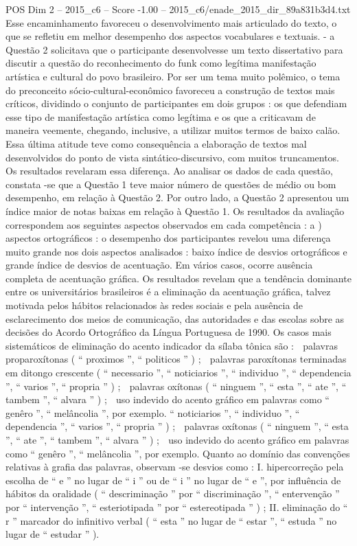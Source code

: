 \begin{textsample}{POS Dim 2 – 2015\_c6 – Score -1.00 – 2015\_c6/enade\_2015\_dir\_89a831b3d4.txt}
Esse encaminhamento favoreceu o desenvolvimento mais articulado do texto, o que se refletiu em melhor desempenho dos aspectos vocabulares e textuais. - a Questão 2 solicitava que o participante desenvolvesse um texto dissertativo para discutir a questão do reconhecimento do funk como legítima manifestação artística e cultural do povo brasileiro.
Por ser um tema muito polêmico, o tema do preconceito sócio-cultural-econômico favoreceu a construção de textos mais críticos, dividindo o conjunto de participantes em dois grupos : os que defendiam esse tipo de manifestação artística como legítima e os que a criticavam de maneira veemente, chegando, inclusive, a utilizar muitos termos de baixo calão.
Essa última atitude teve como consequência a elaboração de textos mal desenvolvidos do ponto de vista sintático-discursivo, com muitos truncamentos.
Os resultados revelaram essa diferença.
Ao analisar os dados de cada questão, constata -se que a Questão 1 teve maior número de questões de médio ou bom desempenho, em relação à Questão 2.
Por outro lado, a Questão 2 apresentou um índice maior de notas baixas em relação à Questão 1.
Os resultados da avaliação correspondem aos seguintes aspectos observados em cada competência : a ) aspectos ortográficos : o desempenho dos participantes revelou uma diferença muito grande nos dois aspectos analisados : baixo índice de desvios ortográficos e grande índice de desvios de acentuação.
Em vários casos, ocorre ausência completa de acentuação gráfica.
Os resultados revelam que a tendência dominante entre os universitários brasileiros é a eliminação da acentuação gráfica, talvez motivada pelos hábitos relacionados às redes sociais e pela ausência de esclarecimento dos meios de comunicação, das autoridades e das escolas sobre as decisões do Acordo Ortográfico da Língua Portuguesa de 1990.
Os casos mais sistemáticos de eliminação do acento indicador da sílaba tônica são :  palavras proparoxítonas ( “ proximos ”, “ politicos ” ) ;  palavras paroxítonas terminadas em ditongo crescente ( “ necessario ”, “ noticiarios ”, “ individuo ”, “ dependencia ”, “ varios ”, “ propria ” ) ;  palavras oxítonas ( “ ninguem ”, “ esta ”, “ ate ”, “ tambem ”, “ alvara ” ) ;  uso indevido do acento gráfico em palavras como “ genêro ”, “ melâncolia ”, por exemplo. “ noticiarios ”, “ individuo ”, “ dependencia ”, “ varios ”, “ propria ” ) ;  palavras oxítonas ( “ ninguem ”, “ esta ”, “ ate ”, “ tambem ”, “ alvara ” ) ;  uso indevido do acento gráfico em palavras como “ genêro ”, “ melâncolia ”, por exemplo.
Quanto ao domínio das convenções relativas à grafia das palavras, observam -se desvios como : I. hipercorreção pela escolha de “ e ” no lugar de “ i ” ou de “ i ” no lugar de “ e ”, por influência de hábitos da oralidade ( “ descriminação ” por “ discriminação ”, “ entervenção ” por “ intervenção ”, “ esteriotipada ” por “ estereotipada ” ) ; II. eliminação do “ r ” marcador do infinitivo verbal ( “ esta ” no lugar de “ estar ”, “ estuda ” no lugar de “ estudar ” ).

\end{textsample}
